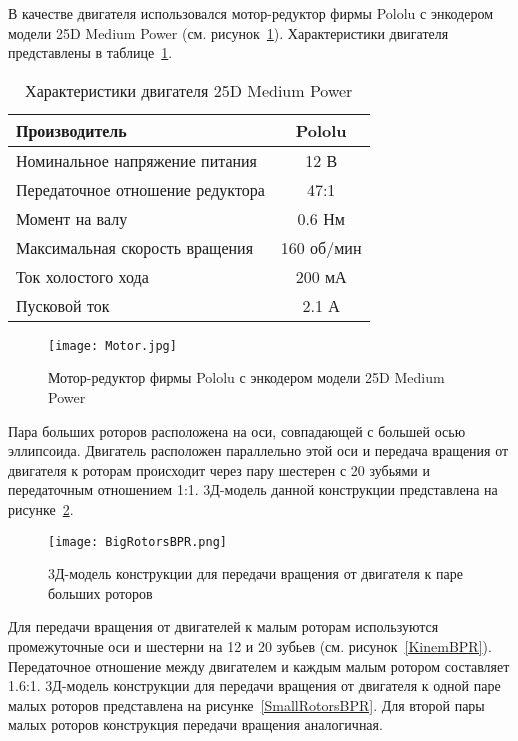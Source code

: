 В качестве двигателя использовался мотор-редуктор фирмы Pololu с энкодером модели 25D Medium Power (см. рисунок~\ref{MotorBPR}). Характеристики двигателя представлены в таблице~\ref{tabMotor}. 

\begin{table}[h]
	\centering
	\caption{Характеристики двигателя 25D Medium Power}\label{tabMotor}
	\begin{tabular}{|l|c|}
		\hline
		Производитель &	Pololu \\ \hline
		Номинальное напряжение питания & 12 В \\ \hline
		Передаточное отношение редуктора & 47:1 \\ \hline
		Момент на валу & 0.6 Нм\\ \hline
		Максимальная скорость вращения & 160 об/мин \\ \hline
		Ток холостого хода & 200 мА\\ \hline
		Пусковой ток & 2.1 А \\ \hline
	\end{tabular}
\end{table}

\begin{figure}[h]
	\centering
	\texttt{[image: Motor.jpg]}%
	\caption{Мотор-редуктор фирмы Pololu с энкодером модели 25D Medium Power}
	\label{MotorBPR}
\end{figure}





Пара больших роторов расположена на оси, совпадающей с большей осью эллипсоида. Двигатель расположен параллельно этой оси и передача вращения от двигателя к роторам происходит через пару шестерен с 20 зубьями и передаточным отношением 1:1. 3Д-модель данной конструкции представлена на рисунке~\ref{BigRotorsBPR}.

\begin{figure}[h]
	\centering
	\texttt{[image: BigRotorsBPR.png]}%
	\caption{3Д-модель конструкции для передачи вращения от двигателя к паре больших роторов}
	\label{BigRotorsBPR}
\end{figure}

Для передачи вращения от двигателей к малым роторам используются промежуточные оси и шестерни на 12 и 20 зубьев (см. рисунок~\ref{KinemBPR}). Передаточное отношение между двигателем и каждым малым ротором составляет 1.6:1. 3Д-модель конструкции для передачи вращения от двигателя к одной паре малых роторов представлена на рисунке~\ref{SmallRotorsBPR}. Для второй пары малых роторов конструкция передачи вращения аналогичная.

